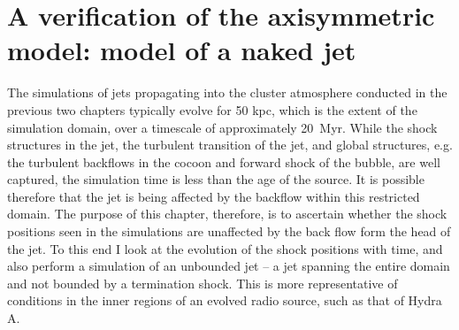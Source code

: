 \chapter{A verification of the axisymmetric model: model of a naked jet}\label{chapter6}
% 
%
The simulations of jets propagating into the cluster atmosphere conducted in the previous two chapters typically evolve for 50 kpc, which is the extent of the simulation domain, over a timescale of approximately 20~Myr. While the shock structures in the jet, the turbulent transition of the jet, and global structures, e.g. the turbulent backflows in the cocoon and forward shock of the bubble, are well captured, the simulation time is less than the age of the source. It is possible therefore that the jet is being affected by the backflow within this restricted domain. The purpose of this chapter, therefore, is to ascertain whether the shock positions seen in the simulations are unaffected by the back flow form the head of the jet. To this end I look at the evolution of the shock positions with time, and also perform a simulation of an unbounded jet -- a jet spanning the entire domain and not bounded by a termination shock. This is more representative of conditions in the inner regions of an evolved radio source, such as that of Hydra A. 


